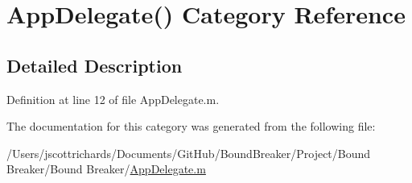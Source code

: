 \hypertarget{category_app_delegate_07_08}{}\section{App\+Delegate() Category Reference}
\label{category_app_delegate_07_08}


\subsection{Detailed Description}


Definition at line 12 of file App\+Delegate.\+m.



The documentation for this category was generated from the following file\+:\begin{DoxyCompactItemize}
\item 
/\+Users/jscottrichards/\+Documents/\+Git\+Hub/\+Bound\+Breaker/\+Project/\+Bound Breaker/\+Bound Breaker/\hyperlink{_app_delegate_8m}{App\+Delegate.\+m}\end{DoxyCompactItemize}
